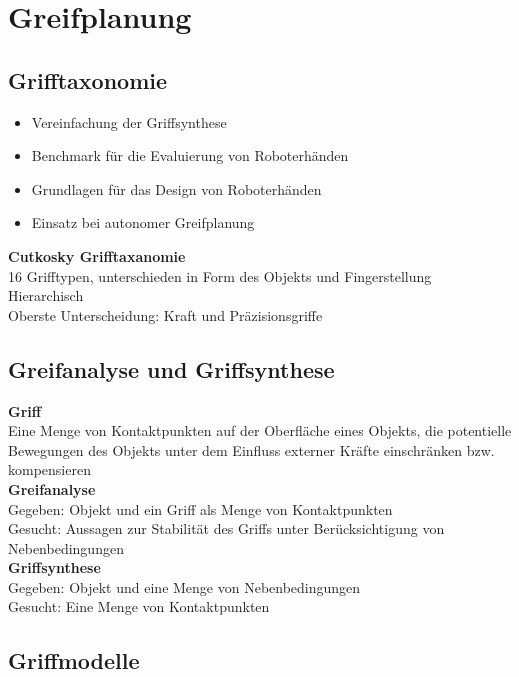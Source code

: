 

\section{Greifplanung}

\subsection{Grifftaxonomie}
\begin{itemize}
\item Vereinfachung der Griffsynthese
\item Benchmark für die Evaluierung von Roboterhänden
\item Grundlagen für das Design von Roboterhänden
\item Einsatz bei autonomer Greifplanung
\end{itemize}

\textbf{Cutkosky Grifftaxanomie}\\
16 Grifftypen, unterschieden in Form des Objekts und Fingerstellung\\
Hierarchisch\\
Oberste Unterscheidung: Kraft und Präzisionsgriffe

\subsection{Greifanalyse und Griffsynthese}
\textbf{Griff}\\
Eine Menge von Kontaktpunkten auf der Oberfläche eines Objekts, die potentielle Bewegungen des Objekts unter dem
Einfluss externer Kräfte einschränken bzw. kompensieren\\

\textbf{Greifanalyse}\\
Gegeben: Objekt und ein Griff als Menge von Kontaktpunkten\\
Gesucht: Aussagen zur Stabilität des Griffs unter Berücksichtigung von Nebenbedingungen\\

\textbf{Griffsynthese}\\
Gegeben: Objekt und eine Menge von Nebenbedingungen\\
Gesucht: Eine Menge von Kontaktpunkten

\subsection{Griffmodelle}

